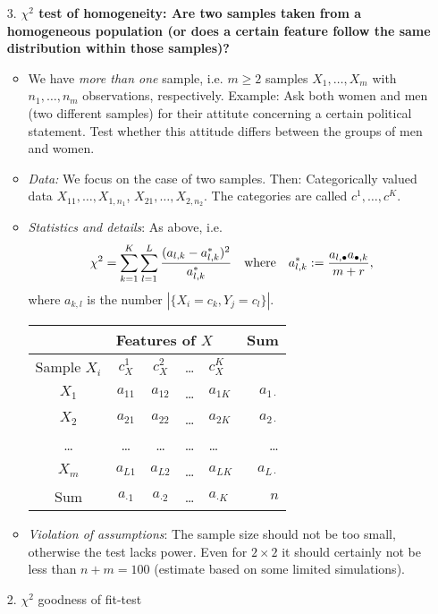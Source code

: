 \documentclass[12pt,a4paper]{amsart}
\theoremstyle{definition}
\theoremstyle{remark}
\numberwithin{equation}{section}
\begin{document}
\begin{itemize}
\item[3.] \textbf{$\chi^2$ test of homogeneity: Are two samples taken from a homogeneous population (or does a certain feature follow the same distribution within those samples)?}
\begin{itemize}
\item We have \textit{more than one} sample, i.e. $m\geq 2$ samples $X_1,\ldots,X_m$ with $n_1,\ldots,n_m$ observations, respectively. Example: Ask both women and men (two different samples) for their attitute concerning a certain political statement. Test whether this attitude differs between the groups of men and women. 
\item \textit{Data:} We focus on the case of two samples. Then: Categorically valued data $X_{11},\ldots, X_{1,n_1}$, $X_{21}, \ldots,X_{2,n_2}$. The categories are called $c^{1}, \ldots, c^{K}$.
\item \textit{Statistics and details}: As above, i.e.
$$\chi^2=\sum_{k=1}^K \sum_{l=1} ^L \frac{(a_{l,k}-a_{l,k}^*)^2}{a_{l,k}^*} \quad \textnormal{where} \quad a_{l,k}^*:=\frac{a_{l, \bullet}a_{\bullet,k}}{m+r},$$
where $a_{k,l}$ is the number  $|\{X_i=c_k, Y_j=c_l\}|$.

\begin{center}
\begin{tabular}{|c|c|c|c|l|r|}
\hline
& \multicolumn{4}{l|}{Features of $X$} & Sum \\
\hline
Sample $X_i$ & $c_X^{1}$ & $c_X^2$ & \ldots & $c_X^K$ &  \\
\hline
$X_1$ & $a_{11}$ & $a_{12}$ & \ldots & $a_{1K}$ & $a_{1 \cdot}$ \\
\hline
$X_2$ & $a_{21}$ & $a_{22}$ & \ldots & $a_{2K}$ & $a_{2 \cdot}$ \\
\hline
\ldots & \ldots & \ldots & \ldots & \ldots & \ldots \\
\hline
$X_m$ &  $a_{L1}$ & $a_{L2}$ & \ldots & $a_{LK}$ & $a_{L \cdot}$ \\
\hline
Sum & $a_{\cdot 1}$ & $a_{\cdot 2}$ & \ldots & $a_{\cdot K}$ & $n$\\
\hline
\end{tabular}
\end{center}

\item \textit{Violation of assumptions}: The sample size should not be too small, otherwise the test lacks power. Even for $2\times 2$ it should certainly not be less than $n+m=100$ (estimate based on some limited simulations).
\end{itemize}
\item[2.] $\chi^2$ goodness of fit-test 
\end{itemize}
\end{document}
